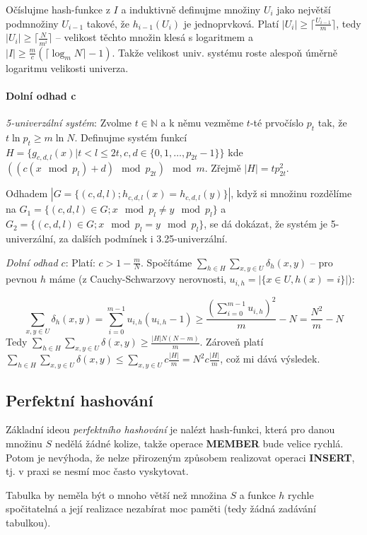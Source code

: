 \documentclass[11pt]{report} %
\numberwithin{equation}{section}
\begin{document}
Očíslujme hash-funkce z $I$ a induktivně definujme množiny
$U_i$ jako největší podmnožiny $U_{i-1}$ takové, že
$h_{i-1}(U_i)$ je jednoprvková. Platí
$|U_i|\geq \lceil \frac{U_{i-1}}{m}\rceil$, tedy
$|U_i|\geq\lceil\frac{N}{m^i}\rceil$ -- velikost těchto množin
klesá s logaritmem a
$|I|\geq \frac{m}{c}(\lceil\log_m N\rceil -1)$. Takže velikost
univ. systému roste alespoň úměrně logaritmu velikosti univerza.

\paragraph{Dolní odhad c}\label{dolnuxed-odhad-c}

\emph{5-univerzální systém}: Zvolme $t\in\mathbb{N}$ a k němu
vezměme $t$-té prvočíslo $p_t$ tak, že
$t\ln p_t\geq m\ln N$. Definujme systém funkcí
$H=\{g_{c,d,l}(x)|t<l\leq 2t, c, d\in\{0,1,\dots,p_{2t}-1\}\}$ kde
$((c(x\mod p_l)+d)\mod p_{2t})\mod m$. Zřejmě
$|H|=tp_{2t}^2$.

Odhadem $|G = \{(c,d,l); h_{c,d,l}(x)=h_{c,d,l}(y)\}|$, když si
množinu rozdělíme na
$G_1 = \{(c,d,l)\in G; x\mod p_l \neq y\mod p_l\}$ a
$G_2 =\{(c,d,l)\in G;x\mod p_l=y\mod p_l\}$, se dá dokázat, že
systém je 5-univerzální, za dalších podmínek i 3.25-univerzální.

\emph{Dolní odhad $c$}: Platí: $c>1-\frac{m}{N}$. Spočítáme
$\sum_{h\in H}\sum_{x,y\in U}\delta_h(x,y)$ -- pro pevnou
$h$ máme (z Cauchy-Schwarzovy nerovnosti,
$u_{i,h}=|\{x\in U,h(x)=i\}|$):

$$\sum_{x,y\in U}\delta_h(x,y)=\sum_{i=0}^{m-1}u_{i,h}(u_{i,h}-1)\geq \frac{(\sum_{i=0}^{m-1}u_{i,h})^2}{m}-N =\frac{N^2}{m}-N$$
Tedy
$\sum_{h\in H}\sum_{x,y\in U}\delta(x,y)\geq \frac{|H|N(N-m)}{m}$.
Zároveň platí
$\sum_{h\in H}\sum_{x,y\in U}\delta(x,y)\leq\sum_{x,y\in U}c\frac{|H|}{m}=N^2c\frac{|H|}{m}$,
což mi dává výsledek.

\subsection{Perfektní hashování}\label{perfektnuxed-hashovuxe1nuxed}

Základní ideou \emph{perfektního hashování} je nalézt hash-funkci, která
pro danou množinu $S$ nedělá žádné kolize, takže operace
\textbf{MEMBER} bude velice rychlá. Potom je nevýhoda, že nelze
přirozeným způsobem realizovat operaci \textbf{INSERT}, tj. v praxi se
nesmí moc často vyskytovat.

Tabulka by neměla být o mnoho větší než množina $S$ a funkce
$h$ rychle spočitatelná a její realizace nezabírat moc paměti
(tedy žádná zadávání tabulkou).
\end{document}
